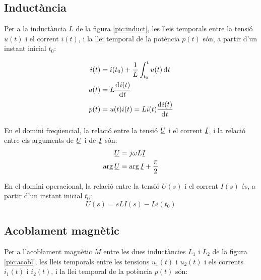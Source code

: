 \subsection{Inductància} 

Per a la inductància $L$ de la figura \vref{pic:induct},
les lleis temporals entre la tensió $u(t)$ i el corrent $i(t)$, i la llei temporal
de la potència $p(t)$ són,  a partir d'un instant inicial $t_0$:

\hfill
\begin{minipage}[b]{5cm}
	
	\label{pic:induct}
\end{minipage}
\hfill
\begin{minipage}[b][3.8cm][t]{8cm}
	\begin{align}
		i(t) &= i(t_0) + \frac{1}{L} \int_{t_0}^t u(t) \diff t \\
		u(t) &= L \deriv{i(t)}{t} \\
		p(t) &= u(t) i(t) = L i(t) \deriv{i(t)}{t}
	\end{align}
\end{minipage}

En el domini freqüencial, la relació entre la tensió $\cmplx{U}$ i el corrent $\cmplx{I}$, i la relació entre els arguments de $\cmplx{U}$ i de $\cmplx{I}$  són:
\begin{align}
	\cmplx{U} &= j \omega L \cmplx{I} \\
	\arg{\cmplx{U}} &= \arg{\cmplx{I}} + \frac{\pi}{2}
\end{align}

 En el domini operacional, la relació entre la tensió $U(s)$ i el corrent $I(s)$ és, a partir d'un instant inicial $t_0$:
\begin{equation}
	U(s) = s L I(s) - L i(t_0)
\end{equation}


\subsection{Acoblament magnètic}\label{sec:acobl-mag} 

Per a l'acoblament magnètic $M$ entre les dues
inductàncies $L_1$ i $L_2$ de la figura \vref{pic:acobl}, les lleis temporals entre les
tensions $u_1(t)$ i $u_2(t)$ i els corrents $i_1(t)$ i $i_2(t)$,  i la llei temporal
de la potència $p(t)$ són:

